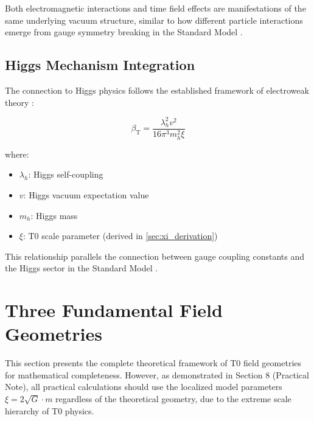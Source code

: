 \documentclass[12pt,a4paper]{article}
\newcommand{\betaT}{\beta_{\text{T}}}
\begin{document}
	\begin{tcolorbox}[colback=blue!5!white,colframe=blue!75!black,title=Vacuum Structure Unity]
		Both electromagnetic interactions and time field effects are manifestations of the same underlying vacuum structure, similar to how different particle interactions emerge from gauge symmetry breaking in the Standard Model \citep{weinberg2003,peskin1995}.
	\end{tcolorbox}
	
	\subsection{Higgs Mechanism Integration}
	\label{subsec:higgs_mechanism}
	
	The connection to Higgs physics follows the established framework of electroweak theory \citep{higgs1964,englert1964,weinberg1967,salam1968}:
	
	\begin{equation}
		\label{eq:higgs_connection}
		\betaT = \frac{\lambda_h^2 v^2}{16\pi^3 m_h^2 \xi}
	\end{equation}
	
	where:
	\begin{itemize}
		\item $\lambda_h$: Higgs self-coupling \citep{djouadi2008}
		\item $v$: Higgs vacuum expectation value \citep{weinberg2003}
		\item $m_h$: Higgs mass \citep{aad2012,chatrchyan2012}
		\item $\xi$: T0 scale parameter (derived in \cref{sec:xi_derivation})
	\end{itemize}
	
	This relationship parallels the connection between gauge coupling constants and the Higgs sector in the Standard Model \citep{peskin1995,weinberg2003}.
	
	\section{Three Fundamental Field Geometries}
	\label{sec:three_geometries}
	
	\begin{tcolorbox}[colback=orange!5!white,colframe=orange!75!black,title=Important Methodological Note]
		This section presents the complete theoretical framework of T0 field geometries for mathematical completeness. However, as demonstrated in Section 8 (Practical Note), all practical calculations should use the localized model parameters $\xi = 2\sqrt{G} \cdot m$ regardless of the theoretical geometry, due to the extreme scale hierarchy of T0 physics.
	\end{tcolorbox}
	
\end{document}
